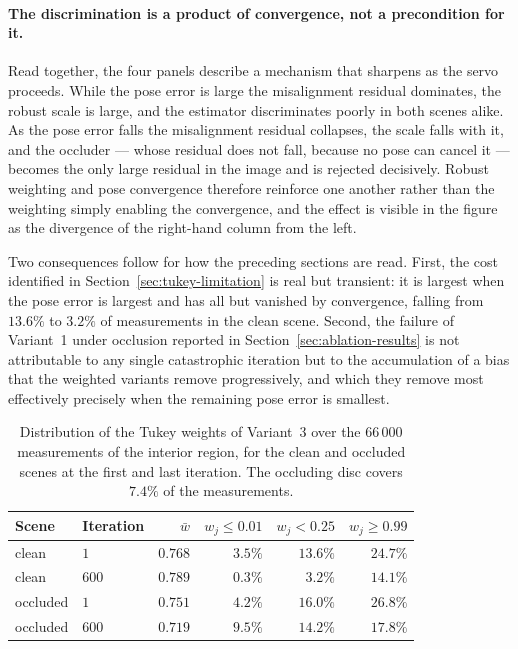 \paragraph{The discrimination is a product of convergence, not a precondition
for it.}
Read together, the four panels describe a mechanism that sharpens as the
servo proceeds. While the pose error is large the misalignment residual
dominates, the robust scale is large, and the estimator discriminates poorly
in both scenes alike. As the pose error falls the misalignment residual
collapses, the scale falls with it, and the occluder --- whose residual does
not fall, because no pose can cancel it --- becomes the only large residual in
the image and is rejected decisively. Robust weighting and pose convergence
therefore reinforce one another rather than the weighting simply enabling the
convergence, and the effect is visible in the figure as the divergence of the
right-hand column from the left.

Two consequences follow for how the preceding sections are read. First, the
cost identified in Section~\ref{sec:tukey-limitation} is real but transient:
it is largest when the pose error is largest and has all but vanished by
convergence, falling from $13.6\%$ to $3.2\%$ of measurements in the clean
scene. Second, the failure of Variant~1 under occlusion reported in
Section~\ref{sec:ablation-results} is not attributable to any single
catastrophic iteration but to the accumulation of a bias that the weighted
variants remove progressively, and which they remove most effectively
precisely when the remaining pose error is smallest.

\begin{table}[t]
    \centering
    \caption{Distribution of the Tukey weights of Variant~3 over the
    $66\,000$ measurements of the interior region, for the clean and occluded
    scenes at the first and last iteration. The occluding disc covers $7.4\%$
    of the measurements.}
    \label{tab:weight-stats}
    \small
    \begin{tabular}{@{}llrrrr@{}}
        \toprule
        Scene & Iteration & $\bar{w}$ & $w_j\le0.01$ & $w_j<0.25$ & $w_j\ge0.99$ \\
        \midrule
        clean    & $1$   & $0.768$ & $3.5\%$ & $13.6\%$ & $24.7\%$ \\
        clean    & $600$ & $0.789$ & $0.3\%$ & $\phantom{0}3.2\%$ & $14.1\%$ \\
        occluded & $1$   & $0.751$ & $4.2\%$ & $16.0\%$ & $26.8\%$ \\
        occluded & $600$ & $0.719$ & $9.5\%$ & $14.2\%$ & $17.8\%$ \\
        \bottomrule
    \end{tabular}
\end{table}

